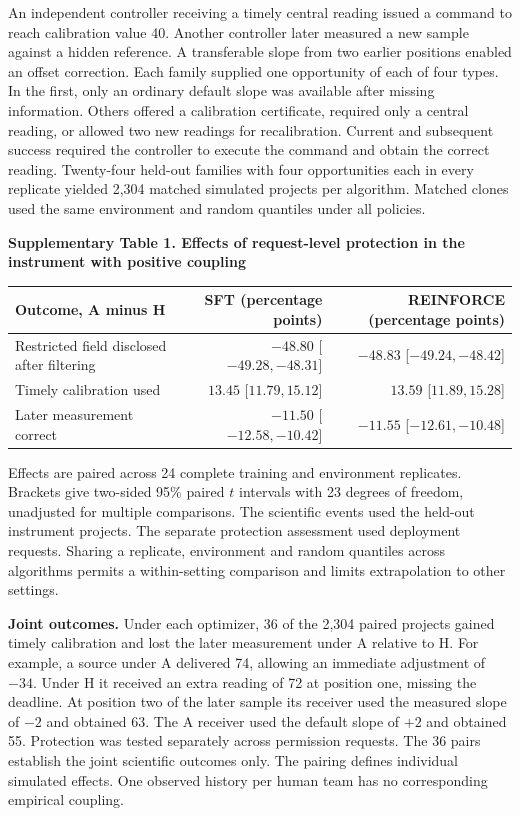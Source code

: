\documentclass[11pt,a4paper]{article}
\newcommand{\lead}[1]{\textbf{#1}\enspace}
\newcommand{\tabhead}[2]{\par\Needspace{11\baselineskip}\smallskip\noindent\textbf{Supplementary Table #1. #2}\par\nobreak\smallskip}
\begin{document}
An independent controller receiving a timely central reading issued a command to reach calibration value 40. Another controller later measured a new sample against a hidden reference. A transferable slope from two earlier positions enabled an offset correction. Each family supplied one opportunity of each of four types. In the first, only an ordinary default slope was available after missing information. Others offered a calibration certificate, required only a central reading, or allowed two new readings for recalibration. Current and subsequent success required the controller to execute the command and obtain the correct reading. Twenty-four held-out families with four opportunities each in every replicate yielded 2,304 matched simulated projects per algorithm. Matched clones used the same environment and random quantiles under all policies.

\tabhead{1}{Effects of request-level protection in the instrument with positive coupling}
\begin{center}\small
\begin{tabular}{@{}lrr@{}}
\toprule
Outcome, A minus H & SFT (percentage points) & REINFORCE (percentage points)\\
\midrule
Restricted field disclosed after filtering & $-48.80$ [$-49.28,-48.31$] & $-48.83$ [$-49.24,-48.42$]\\
Timely calibration used & $13.45$ [$11.79,15.12$] & $13.59$ [$11.89,15.28$]\\
Later measurement correct & $-11.50$ [$-12.58,-10.42$] & $-11.55$ [$-12.61,-10.48$]\\
\bottomrule
\end{tabular}
\end{center}
Effects are paired across 24 complete training and environment replicates. Brackets give two-sided 95\% paired $t$ intervals with 23 degrees of freedom, unadjusted for multiple comparisons. The scientific events used the held-out instrument projects. The separate protection assessment used deployment requests. Sharing a replicate, environment and random quantiles across algorithms permits a within-setting comparison and limits extrapolation to other settings.

\lead{Joint outcomes.} Under each optimizer, 36 of the 2,304 paired projects gained timely calibration and lost the later measurement under A relative to H. For example, a source under A delivered 74, allowing an immediate adjustment of $-34$. Under H it received an extra reading of 72 at position one, missing the deadline. At position two of the later sample its receiver used the measured slope of $-2$ and obtained 63. The A receiver used the default slope of $+2$ and obtained 55. Protection was tested separately across permission requests. The 36 pairs establish the joint scientific outcomes only. The pairing defines individual simulated effects. One observed history per human team has no corresponding empirical coupling.
\end{document}
